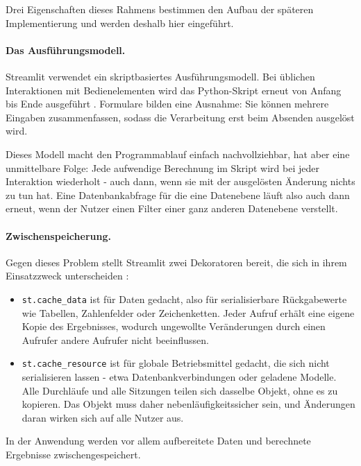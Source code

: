 \documentclass[12pt,a4paper]{report}
\begin{document}
Drei Eigenschaften dieses Rahmens bestimmen den Aufbau der späteren Implementierung und
werden deshalb hier eingeführt.

\paragraph{Das Ausführungsmodell.}


Streamlit verwendet ein skriptbasiertes Ausführungsmodell.
Bei üblichen Interaktionen mit Bedienelementen wird das
Python-Skript erneut von Anfang bis Ende ausgeführt
\cite{StreamlitCaching}. Formulare bilden eine Ausnahme:
Sie können mehrere Eingaben zusammenfassen, sodass die
Verarbeitung erst beim Absenden ausgelöst wird.

Dieses Modell macht den Programmablauf einfach nachvollziehbar, hat aber eine unmittelbare
Folge: Jede aufwendige Berechnung im Skript wird bei jeder Interaktion wiederholt - auch
dann, wenn sie mit der ausgelösten Änderung nichts zu tun hat. Eine Datenbankabfrage für
die eine Datenebene läuft also auch dann erneut, wenn der Nutzer einen Filter einer ganz
anderen Datenebene verstellt.

\paragraph{Zwischenspeicherung.}

Gegen dieses Problem stellt Streamlit zwei Dekoratoren bereit, die sich in ihrem
Einsatzzweck unterscheiden \cite{StreamlitCaching}:

\begin{itemize}
    \item \texttt{st.cache\_data} ist für Daten gedacht, also für serialisierbare
    Rückgabewerte wie Tabellen, Zahlenfelder oder Zeichenketten. Jeder Aufruf erhält eine
    eigene Kopie des Ergebnisses, wodurch ungewollte Veränderungen durch einen Aufrufer
    andere Aufrufer nicht beeinflussen.
    \item \texttt{st.cache\_resource} ist für globale Betriebsmittel gedacht, die sich
    nicht serialisieren lassen - etwa Datenbankverbindungen oder geladene Modelle. Alle
    Durchläufe und alle Sitzungen teilen sich dasselbe Objekt, ohne es zu kopieren. Das
    Objekt muss daher nebenläufigkeitssicher sein, und Änderungen daran wirken sich auf
    alle Nutzer aus.
\end{itemize}

In der Anwendung werden vor allem aufbereitete Daten und berechnete Ergebnisse
zwischengespeichert.
\end{document}
